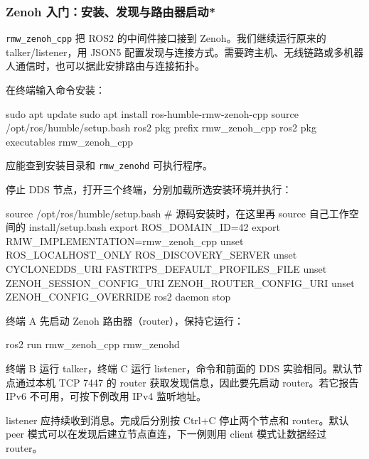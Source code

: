 \subsubsection{Zenoh 入门：安装、发现与路由器启动*}
\texttt{rmw\_zenoh\_cpp} 把 ROS2 的中间件接口接到 Zenoh。我们继续运行原来的 talker/listener，用 JSON5 配置发现与连接方式。需要跨主机、无线链路或多机器人通信时，也可以据此安排路由与连接拓扑。

\begin{example}
在终端输入命令安装：
\par\medskip\noindent\begin{minipage}{\linewidth}
\begin{tbash}
sudo apt update
sudo apt install ros-humble-rmw-zenoh-cpp
source /opt/ros/humble/setup.bash
ros2 pkg prefix rmw_zenoh_cpp
ros2 pkg executables rmw_zenoh_cpp
\end{tbash}
\end{minipage}\par\smallskip
应能查到安装目录和 \texttt{rmw\_zenohd} 可执行程序。

停止 DDS 节点，打开三个终端，分别加载所选安装环境并执行：
\par\medskip\noindent\begin{minipage}{\linewidth}
\begin{tbash}
source /opt/ros/humble/setup.bash
# 源码安装时，在这里再 source 自己工作空间的 install/setup.bash
export ROS_DOMAIN_ID=42
export RMW_IMPLEMENTATION=rmw_zenoh_cpp
unset ROS_LOCALHOST_ONLY ROS_DISCOVERY_SERVER
unset CYCLONEDDS_URI FASTRTPS_DEFAULT_PROFILES_FILE
unset ZENOH_SESSION_CONFIG_URI ZENOH_ROUTER_CONFIG_URI
unset ZENOH_CONFIG_OVERRIDE
ros2 daemon stop
\end{tbash}
\end{minipage}\par\smallskip
终端 A 先启动 Zenoh 路由器（router），保持它运行：
\par\medskip\noindent\begin{minipage}{\linewidth}
\begin{tbash}
ros2 run rmw_zenoh_cpp rmw_zenohd
\end{tbash}
\end{minipage}\par\smallskip
终端 B 运行 talker，终端 C 运行 listener，命令和前面的 DDS 实验相同。默认节点通过本机 TCP 7447 的 router 获取发现信息，因此要先启动 router。若它报告 IPv6 不可用，可按下例改用 IPv4 监听地址。

listener 应持续收到消息。完成后分别按 Ctrl+C 停止两个节点和 router。默认 peer 模式可以在发现后建立节点直连，下一例则用 client 模式让数据经过 router。
\end{example}

